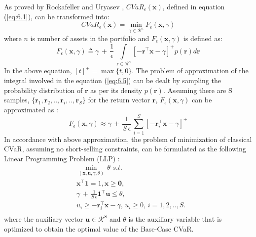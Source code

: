 \documentclass[12pt]{article}
\numberwithin{equation}{section}
\begin{document}
As proved by Rockafeller and Uryasev \cite{rockafellar1} , $CVaR_{\epsilon}(\mathbf{x})$, defined in equation (\ref{eq:6.1}), can be transformed into: 
\begin{equation}
\label{eq:6.4}
CVaR_{\epsilon}(\mathbf{x}) = \min_{\gamma \in \mathcal{R}^{n}} F_{\epsilon}(\mathbf{x},\gamma)
\end{equation}
where $n$ is number of assets in the portfolio and $F_{\epsilon}(\mathbf{x},\gamma)$ is defined as:
\begin{equation}
\label{eq:6.5}
 F_{\epsilon}(\mathbf{x},\gamma) \triangleq \gamma \, + \, \frac{1}{\epsilon} \, \int \limits_{\mathbf{r} \in \mathcal{R}^{n}} [-\mathbf{r}^{\top}\mathbf{x}-\gamma]^{+} p(\mathbf{r})  d\mathbf{r}
\end{equation}
In the above equation, $[t]^{+}=\max \{t,0\}$. The problem of approximation of the integral involved in the equation (\ref{eq:6.5}) can be dealt by sampling the probability distribution of $\mathbf{r}$ as per its density $p(\mathbf{r})$. Assuming there are S samples, $\{ \mathbf{r}_{1}, \mathbf{r}_{2}, .., \mathbf{r}_{i},..,\mathbf{r}_{S}\}$ for the return vector $\mathbf{r}$, $ F_{\epsilon}(\mathbf{x},\gamma)$ can be approximated as \cite{rockafellar1}:
\begin{equation}
\label{eq:6.6}
 F_{\epsilon}(\mathbf{x},\gamma) \approx \gamma \, + \, \frac{1}{S \, \epsilon} \, \sum_{i=1}^{S} [-\mathbf{r}_{i}^{\top}\mathbf{x}-\gamma]^{+} 
\end{equation}
In accordance with above approximation, the problem of minimization of classical CVaR, assuming no short-selling constraints, can be formulated as the following Linear Programming Problem (LLP) \cite{rockafellar1,zhu}:
\begin{equation}
\label{eq:6.7}
\begin{split}
& \min_{(\mathbf{x},\mathbf{u},\gamma,\theta)} \, \theta \, \, s.t. \\
& \mathbf{x}^{\top}\mathbf{1}=1, \mathbf{x} \geq \mathbf{0}, \\
& \gamma \, + \, \frac{1}{S \, \epsilon} \mathbf{1}^{\top}\mathbf{u} \leq \theta, \\
& u_{i} \geq -\mathbf{r}_{i}^{\top}\mathbf{x}-\gamma, \, u_{i} \geq 0, \, i=1,2,..,S. \\
\end{split}
\end{equation}
where the auxiliary vector $\mathbf{u} \in \mathcal{R}^S$ and $\theta$ is the auxiliary variable that is optimized to obtain the optimal value of the Base-Case CVaR.
\end{document}
